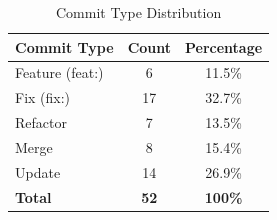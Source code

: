 	\begin{table}[h]
	\centering
	\begin{tabular}{|l|c|c|}
	\hline
	\textbf{Commit Type} & \textbf{Count} & \textbf{Percentage} \\
	\hline
	Feature (feat:) & 6 & 11.5\% \\
	Fix (fix:) & 17 & 32.7\% \\
	Refactor & 7 & 13.5\% \\
	Merge & 8 & 15.4\% \\
	Update & 14 & 26.9\% \\
	\hline
	\textbf{Total} & \textbf{52} & \textbf{100\%} \\
	\hline
	\end{tabular}
	\caption{Commit Type Distribution}
	\end{table}
